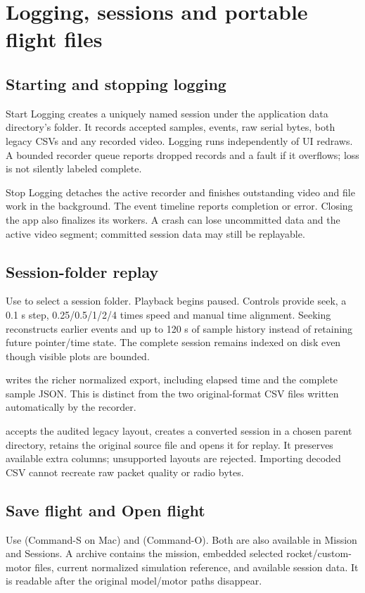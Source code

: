 \section{Logging, sessions and portable flight files}\label{sec:persistence}
\subsection{Starting and stopping logging}
Start Logging creates a uniquely named session under the application data
directory's  folder. It records accepted samples, events,
raw serial bytes, both legacy CSVs and any recorded video. Logging runs
independently of UI redraws. A bounded recorder queue reports dropped records
and a fault if it overflows; loss is not silently labeled complete.

Stop Logging detaches the active recorder and finishes outstanding video and
file work in the background. The event timeline reports completion or error.
Closing the app also finalizes its workers. A crash can lose uncommitted data and
the active video segment; committed session data may still be replayable.

\subsection{Session-folder replay}
Use  to select a session folder. Playback begins paused.
Controls provide seek, a 0.1 s step, 0.25/0.5/1/2/4 times speed and manual time
alignment. Seeking reconstructs earlier events and up to 120 s of sample
history instead of retaining future pointer/time state. The complete session
remains indexed on disk even though visible plots are bounded.

 writes the richer normalized export, including elapsed
time and the complete sample JSON. This is distinct from the two original-format
CSV files written automatically by the recorder.

 accepts the audited legacy layout, creates a converted
session in a chosen parent directory, retains the original source file and
opens it for replay. It preserves available extra columns; unsupported layouts
are rejected. Importing decoded CSV cannot recreate raw packet quality or radio
bytes.

\subsection{Save flight and Open flight}
Use  (Command-S on Mac) and
 (Command-O). Both are also available in Mission
and Sessions. A  archive contains the mission, embedded selected
rocket/custom-motor files, current normalized simulation reference, and available
session data. It is readable after the original model/motor paths disappear.


